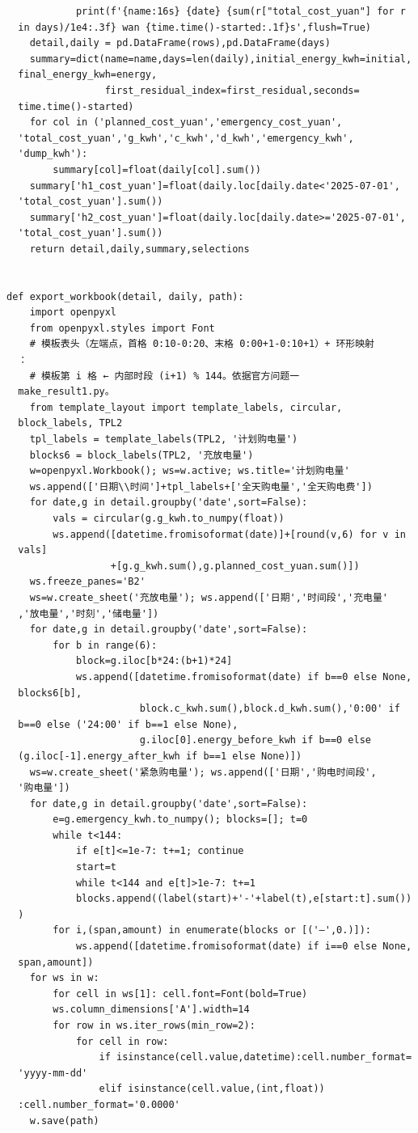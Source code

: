 \begin{verbatim}
            print(f'{name:16s} {date} {sum(r["total_cost_yuan"] for r
  in days)/1e4:.3f} wan {time.time()-started:.1f}s',flush=True)
    detail,daily = pd.DataFrame(rows),pd.DataFrame(days)
    summary=dict(name=name,days=len(daily),initial_energy_kwh=initial,
  final_energy_kwh=energy,
                 first_residual_index=first_residual,seconds=
  time.time()-started)
    for col in ('planned_cost_yuan','emergency_cost_yuan',
  'total_cost_yuan','g_kwh','c_kwh','d_kwh','emergency_kwh',
  'dump_kwh'):
        summary[col]=float(daily[col].sum())
    summary['h1_cost_yuan']=float(daily.loc[daily.date<'2025-07-01',
  'total_cost_yuan'].sum())
    summary['h2_cost_yuan']=float(daily.loc[daily.date>='2025-07-01',
  'total_cost_yuan'].sum())
    return detail,daily,summary,selections


def export_workbook(detail, daily, path):
    import openpyxl
    from openpyxl.styles import Font
    # 模板表头（左端点，首格 0:10-0:20、末格 0:00+1-0:10+1）+ 环形映射
  ：
    # 模板第 i 格 ← 内部时段 (i+1) % 144。依据官方问题一
  make_result1.py。
    from template_layout import template_labels, circular,
  block_labels, TPL2
    tpl_labels = template_labels(TPL2, '计划购电量')
    blocks6 = block_labels(TPL2, '充放电量')
    w=openpyxl.Workbook(); ws=w.active; ws.title='计划购电量'
    ws.append(['日期\\时间']+tpl_labels+['全天购电量','全天购电费'])
    for date,g in detail.groupby('date',sort=False):
        vals = circular(g.g_kwh.to_numpy(float))
        ws.append([datetime.fromisoformat(date)]+[round(v,6) for v in
  vals]
                  +[g.g_kwh.sum(),g.planned_cost_yuan.sum()])
    ws.freeze_panes='B2'
    ws=w.create_sheet('充放电量'); ws.append(['日期','时间段','充电量'
  ,'放电量','时刻','储电量'])
    for date,g in detail.groupby('date',sort=False):
        for b in range(6):
            block=g.iloc[b*24:(b+1)*24]
            ws.append([datetime.fromisoformat(date) if b==0 else None,
  blocks6[b],
                       block.c_kwh.sum(),block.d_kwh.sum(),'0:00' if
  b==0 else ('24:00' if b==1 else None),
                       g.iloc[0].energy_before_kwh if b==0 else
  (g.iloc[-1].energy_after_kwh if b==1 else None)])
    ws=w.create_sheet('紧急购电量'); ws.append(['日期','购电时间段',
  '购电量'])
    for date,g in detail.groupby('date',sort=False):
        e=g.emergency_kwh.to_numpy(); blocks=[]; t=0
        while t<144:
            if e[t]<=1e-7: t+=1; continue
            start=t
            while t<144 and e[t]>1e-7: t+=1
            blocks.append((label(start)+'-'+label(t),e[start:t].sum())
  )
        for i,(span,amount) in enumerate(blocks or [('—',0.)]):
            ws.append([datetime.fromisoformat(date) if i==0 else None,
  span,amount])
    for ws in w:
        for cell in ws[1]: cell.font=Font(bold=True)
        ws.column_dimensions['A'].width=14
        for row in ws.iter_rows(min_row=2):
            for cell in row:
                if isinstance(cell.value,datetime):cell.number_format=
  'yyyy-mm-dd'
                elif isinstance(cell.value,(int,float))
  :cell.number_format='0.0000'
    w.save(path)



\end{verbatim}
